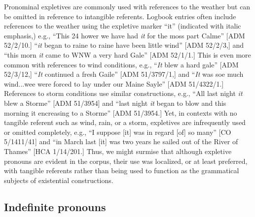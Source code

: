 Pronominal expletives are commonly used with references to the weather but can be omitted in reference to intangible referents.  Logbook entries often include references to the weather using the expletive marker “it” (indicated with italic emphasis,) e.g., “This 24 hower we have had \textit{it} for the moss part Calme” [ADM 52/2/10.] “\textit{it} began to raine to raine have been little wind” [ADM 52/2/3,] and “this morn \textit{it} came to WNW a very hard Gale” [ADM 52/1/1.] This is even more common with references to wind conditions, e.g., “\textit{It} blew a hard gale” [ADM 52/3/12,] “\textit{It} continued a fresh Gaile” [ADM 51/3797/1,] and “\textit{It} was soe much wind...wee were forced to lay under our Maine Sayle” [ADM 51/4322/1.] References to storm conditions use similar constructions, e.g., “All last night \textit{it} blew a Storme” [ADM 51/3954] and “last night \textit{it} began to blow and this morning it encreasing to a Storme” [ADM 51/3954.] Yet, in contexts with no tangible referent such as wind, rain, or a storm, expletives are infrequently used or omitted completely, e.g., “I suppose [it] was in regard [of] so many” [CO 5/1411/41] and “in March last [it] was two years he sailed out of the River of Thames” [HCA 1/14/201.] Thus, we might surmise that although expletive pronouns are evident in the corpus, their use was localized, or at least preferred, with tangible referents rather than being used to function as the grammatical subjects of existential constructions.

\subsection{{Indefinite} {pronouns}}%

